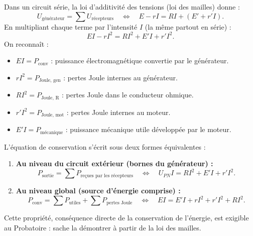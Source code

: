 \documentclass[11pt]{article}
\begin{document}
\begin{propriete}
Dans un circuit série, la loi d'additivité des tensions (loi des mailles) donne :
\[ U_{\text{générateur}} = \sum U_{\text{récepteurs}} \quad\Longleftrightarrow\quad E - rI = RI + (E' + r'I). \]
En multipliant chaque terme par l'intensité $I$ (la même partout en série) :
\[ EI - rI^2 = RI^2 + E'I + r'I^2. \]
On reconnaît :
\begin{itemize}
\item $EI = P_{\text{conv}}$ : puissance électromagnétique convertie par le générateur.
\item $rI^2 = P_{\text{Joule, gen}}$ : pertes Joule internes au générateur.
\item $RI^2 = P_{\text{Joule, R}}$ : pertes Joule dans le conducteur ohmique.
\item $r'I^2 = P_{\text{Joule, mot}}$ : pertes Joule internes au moteur.
\item $E'I = P_{\text{mécanique}}$ : puissance mécanique utile développée par le moteur.
\end{itemize}
L'équation de conservation s'écrit sous deux formes équivalentes :
\begin{enumerate}
\item \textbf{Au niveau du circuit extérieur (bornes du générateur) :}
\[ \boxed{P_{\text{sortie}} = \sum P_{\text{reçues par les récepteurs}}} \quad\Longleftrightarrow\quad U_{PN}I = RI^2 + E'I + r'I^2. \]
\item \textbf{Au niveau global (source d'énergie comprise) :}
\[ \boxed{P_{\text{conv}} = \sum P_{\text{utiles}} + \sum P_{\text{pertes Joule}}} \quad\Longleftrightarrow\quad EI = E'I + rI^2 + r'I^2 + RI^2. \]
\end{enumerate}
Cette propriété, conséquence directe de la conservation de l'énergie, est exigible au Probatoire : sache la démontrer à partir de la loi des mailles.
\end{propriete}
\end{document}
